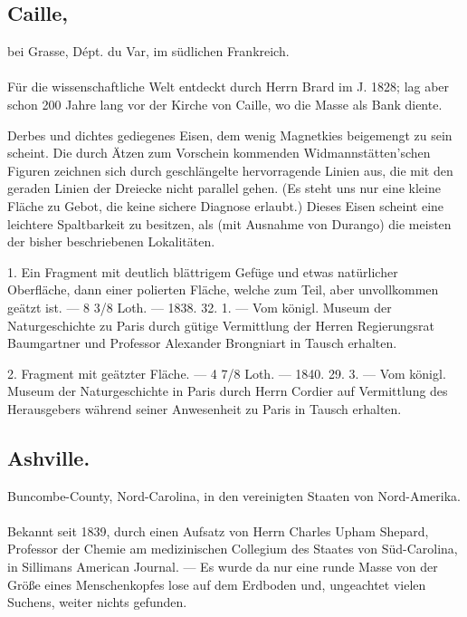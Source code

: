 \documentclass[a4paper, 11pt, oneside, polutonikogreek, german]{article}
\begin{document}
\subsection[Caille.]{Caille,}
\begin{center}
\small
bei Grasse, Dépt. du Var, im südlichen Frankreich.
\end{center}
\paragraph{}
Für die wissenschaftliche Welt entdeckt durch Herrn Brard im J. 1828; lag aber schon 200 Jahre lang vor der Kirche von Caille, wo die Masse als Bank diente.

Derbes und dichtes gediegenes Eisen, dem wenig Magnetkies beigemengt zu sein scheint. Die durch Ätzen zum Vorschein kommenden Widmannstätten'schen Figuren zeichnen sich durch geschlängelte hervorragende Linien aus, die mit den geraden Linien der Dreiecke nicht parallel gehen. (Es steht uns nur eine kleine Fläche zu Gebot, die keine sichere Diagnose erlaubt.) Dieses Eisen scheint eine leichtere Spaltbarkeit zu besitzen, als (mit Ausnahme von Durango) die meisten der bisher beschriebenen Lokalitäten.

1. Ein Fragment mit deutlich blättrigem Gefüge und etwas natürlicher Oberfläche, dann einer polierten Fläche, welche zum Teil, aber unvollkommen geätzt ist. — 8 3/8 Loth. — 1838. 32. 1. — Vom königl. Museum der Naturgeschichte zu Paris durch gütige Vermittlung der Herren Regierungsrat Baumgartner und Professor Alexander Brongniart in Tausch erhalten.

2. Fragment mit geätzter Fläche. — 4 7/8 Loth. — 1840. 29. 3. — Vom königl. Museum der Naturgeschichte in Paris durch Herrn Cordier auf Vermittlung des Herausgebers während seiner Anwesenheit zu Paris in Tausch erhalten.
\subsection{Ashville.}
\begin{center}
\small
Buncombe-County, Nord-Carolina, in den vereinigten Staaten von Nord-Amerika.
\end{center}
\paragraph{}
Bekannt seit 1839, durch einen Aufsatz von Herrn Charles Upham Shepard, Professor der Chemie am medizinischen Collegium des Staates von Süd-Carolina, in Sillimans American Journal. — Es wurde da nur eine runde Masse von der Größe eines Menschenkopfes lose auf dem Erdboden und, ungeachtet vielen Suchens, weiter nichts gefunden.
\end{document}
